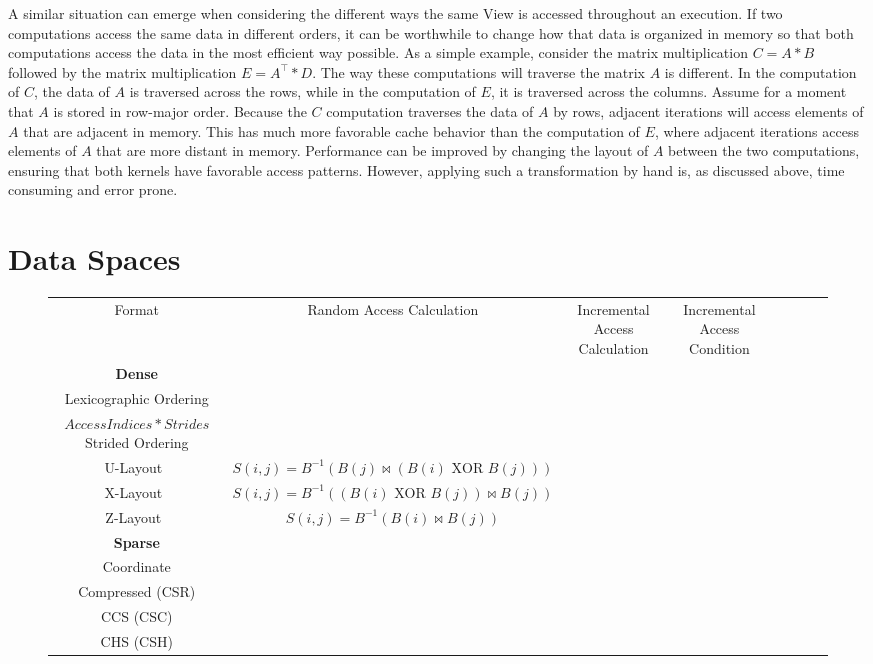 A similar situation can emerge when considering the different ways the same View is accessed throughout an execution.
If two computations access the same data in different orders, it can be worthwhile to change how that data is organized in memory so that both computations access the data in the most efficient way possible.
As a simple example, consider the matrix multiplication $C = A * B$ followed by the matrix multiplication $E = A^{\top} * D$. 
The way these computations will traverse the matrix $A$ is different. 
In the computation of $C$, the data of $A$ is traversed across the rows, while in the computation of $E$, it is traversed across the columns.
Assume for a moment that $A$ is stored in row-major order.
Because the $C$ computation traverses the data of $A$ by rows, adjacent iterations will access elements of $A$ that are adjacent in memory.
This has much more favorable cache behavior than the computation of $E$, where adjacent iterations access elements of $A$ that are more distant in memory.
Performance can be improved by changing the layout of $A$ between the two computations, ensuring that both kernels have favorable access patterns.
However, applying such a transformation by hand is, as discussed above, time consuming and error prone. 

\section{Data Spaces}



\begin{figure}
\begin{tabular*}{7in}[h]{|c|c | c c c c | c c |}
Format & Random Access Calculation & Incremental Access Calculation & Incremental Access Condition \\
\textbf{Dense} \\
Lexicographic Ordering \\ $AccessIndices * Strides$
Strided Ordering \\ 
U-Layout~\cite{chatterjee1999recursive} & $S(i,j) = B^{-1}(B(j) \bowtie (B(i) \text{ XOR } B(j)))$ \\
X-Layout~\cite{chatterjee1999recursive} & $S(i,j) = B^{-1}((B(i) \text{ XOR } B(j)) \bowtie B(j))$ \\
Z-Layout~\cite{chatterjee1999recursive} & $S(i,j) = B^{-1}(B(i) \bowtie B(j))$ \\
\textbf{Sparse} \\
Coordinate \\
Compressed  (CSR) \\ 
CCS (CSC) \\
CHS (CSH) \\ 
\end{tabular*}
\end{figure}

